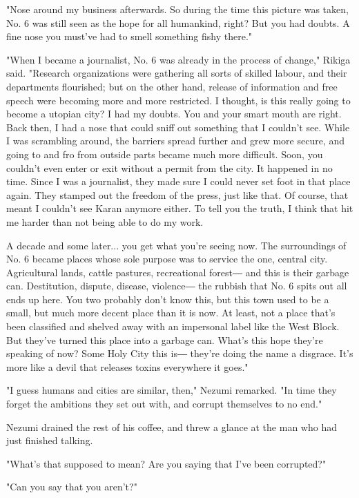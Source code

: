 "Nose around my business afterwards. So during the time this picture was
taken, No. 6 was still seen as the hope for all humankind, right? But
you had doubts. A fine nose you must've had to smell something fishy
there."

"When I became a journalist, No. 6 was already in the process of
change," Rikiga said. "Research organizations were gathering all sorts
of skilled labour, and their departments flourished; but on the other
hand, release of information and free speech were becoming more and more
restricted. I thought, is this really going to become a utopian city? I
had my doubts. You and your smart mouth are right. Back then, I had a
nose that could sniff out something that I couldn't see. While I was
scrambling around, the barriers spread further and grew more secure, and
going to and fro from outside parts became much more difficult. Soon,
you couldn't even enter or exit without a permit from the city. It
happened in no time. Since I was a journalist, they made sure I could
never set foot in that place again. They stamped out the freedom of the
press, just like that. Of course, that meant I couldn't see Karan
anymore either. To tell you the truth, I think that hit me harder than
not being able to do my work.

A decade and some later... you get what you're seeing now. The
surroundings of No. 6 became places whose sole purpose was to service
the one, central city. Agricultural lands, cattle pastures, recreational
forest― and this is their garbage can. Destitution, dispute, disease,
violence― the rubbish that No. 6 spits out all ends up here. You two
probably don't know this, but this town used to be a small, but much
more decent place than it is now. At least, not a place that's been
classified and shelved away with an impersonal label like the West
Block. But they've turned this place into a garbage can. What's this
hope they're speaking of now? Some Holy City this is― they're doing the
name a disgrace. It's more like a devil that releases toxins everywhere
it goes."

"I guess humans and cities are similar, then," Nezumi remarked. "In time
they forget the ambitions they set out with, and corrupt themselves to
no end."

Nezumi drained the rest of his coffee, and threw a glance at the man who
had just finished talking.

"What's that supposed to mean? Are you saying that I've been corrupted?"

"Can you say that you aren't?"

